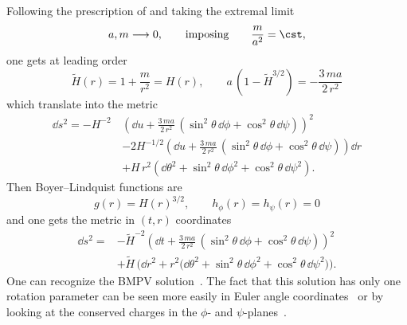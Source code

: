Following the prescription of \cite{Breckenridge:1997:DbranesSpinningBlack, Gauntlett:1999:BlackHolesD5} and taking the extremal limit
\begin{equation}
	\label{higher-jna:eq:5d-bmpv-extremal-limit}
	a, m \longrightarrow 0, \qquad
	\text{imposing} \qquad
	\frac{m}{a^2} = \cst ,
\end{equation}
one gets at leading order
\begin{equation}
	\tilde H(r) = 1 + \frac{m}{r^2} = H(r), \qquad
	a\, (1 - \tilde H^{3/2}) = - \frac{3\, m a}{2\, r^2}
\end{equation} 
which translate into the metric
\begin{equation}
	\begin{aligned}
		\dd s^2 = - H^{-2}\, & \left(\dd u
				+ \frac{3\, m a}{2\, r^2}\, (\sin^2 \theta\, \dd\phi + \cos^2 \theta\, \dd\psi) \right)^2 \\
			&- 2 H^{-1/2} \left( \dd u + \frac{3\, m a}{2\, r^2}\, (\sin^2 \theta\, \dd\phi + \cos^2 \theta\, \dd\psi) \right) \dd r \\
			&+ H\, r^2 (\dd \theta^2 + \sin^2 \theta\, \dd\phi^2 + \cos^2 \theta\, \dd\psi^2).
	\end{aligned}
\end{equation} 
Then Boyer--Lindquist functions are
\begin{equation}
	\label{higher:change:bmpv:g-h}
	g(r) = H(r)^{3/2}, \qquad
	h_\phi(r) = h_\psi(r) = 0
\end{equation} 
and one gets the metric in $(t, r)$ coordinates
\begin{equation}
	\label{higher-jna:metric:5d-bmpv:bmpv-metric}
	\begin{aligned}
		\dd s^2 = &- \tilde H^{-2} \left(\dd t
				+ \frac{3\, m a}{2\, r^2}\, (\sin^2 \theta\, \dd\phi + \cos^2 \theta\, \dd\psi) \right)^2 \\
			&+ \tilde H\, \Big(\dd r^2 + r^2 \big( \dd \theta^2 + \sin^2 \theta\, \dd\phi^2 + \cos^2 \theta\, \dd\psi^2 \big) \Big).
	\end{aligned}
\end{equation} 
One can recognize the BMPV solution~\cites[p.~4]{Breckenridge:1997:DbranesSpinningBlack}[p.~16]{Gauntlett:1999:BlackHolesD5}.
The fact that this solution has only one rotation parameter can be seen more easily in Euler angle coordinates~\cites[sec.~3]{Gauntlett:1999:BlackHolesD5}[sec.~2]{Gibbons:1999:SupersymmetricRotatingBlack} or by looking at the conserved charges in the $\phi$- and $\psi$-planes~\cite[sec.~3]{Breckenridge:1997:DbranesSpinningBlack}.


